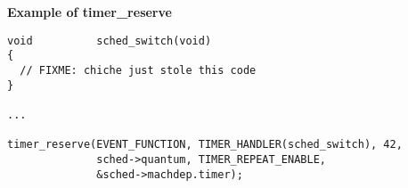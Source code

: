\textbf{Example of timer\_reserve}

\begin{verbatim}
void          sched_switch(void)
{
  // FIXME: chiche just stole this code
}

...

timer_reserve(EVENT_FUNCTION, TIMER_HANDLER(sched_switch), 42,
              sched->quantum, TIMER_REPEAT_ENABLE,
              &sched->machdep.timer);
\end{verbatim}
